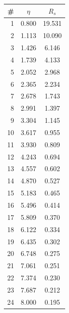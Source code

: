 \documentclass{article}
\begin{document}
\begin{multicols}{3}
\begin{tabular}{| r | c | c |}
\hline
\# & $\eta$ & $R_s$ \\ 
\hline
 1  &   0.800  &  19.531  \\
 2  &   1.113  &  10.090  \\
 3  &   1.426  &   6.146  \\
 4  &   1.739  &   4.133  \\
 5  &   2.052  &   2.968  \\
 6  &   2.365  &   2.234  \\
 7  &   2.678  &   1.743  \\
 8  &   2.991  &   1.397  \\
 9  &   3.304  &   1.145  \\
10  &   3.617  &   0.955  \\
11  &   3.930  &   0.809  \\
12  &   4.243  &   0.694  \\
13  &   4.557  &   0.602  \\
14  &   4.870  &   0.527  \\
15  &   5.183  &   0.465  \\
16  &   5.496  &   0.414  \\
17  &   5.809  &   0.370  \\
18  &   6.122  &   0.334  \\
19  &   6.435  &   0.302  \\
20  &   6.748  &   0.275  \\
21  &   7.061  &   0.251  \\
22  &   7.374  &   0.230  \\
23  &   7.687  &   0.212  \\
24  &   8.000  &   0.195  \\
\hline
\end{tabular}


\end{multicols}
\end{document}

